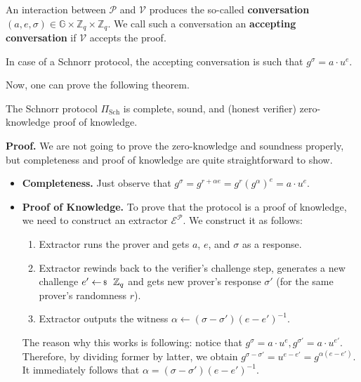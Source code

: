 \documentclass[../lecture-notes-148x210.tex]{subfiles}
\begin{document}
\begin{definition}
    An interaction between $\mathcal{P}$ and $\mathcal{V}$ produces the so-called \textbf{conversation} $(a,e,\sigma) \in \mathbb{G} \times \mathbb{Z}_q \times \mathbb{Z}_q$. We call such a conversation an \textbf{accepting conversation} if $\mathcal{V}$ accepts the proof.
\end{definition}

\begin{example}
    In case of a Schnorr protocol, the accepting conversation is such that $g^{\sigma} = a \cdot u^e$.
\end{example}

Now, one can prove the following theorem.
\begin{theorem}
    The Schnorr protocol $\Pi_{\text{Sch}}$ is complete, sound, and (honest verifier) zero-knowledge proof of knowledge.
\end{theorem}

\textbf{Proof.} We are not going to prove the zero-knowledge and soundness properly, but completeness and proof of knowledge are quite straightforward to show.

\begin{itemize}
    \item \textbf{Completeness.} Just observe that $g^{\sigma} = g^{r+\alpha e} = g^r(g^{\alpha})^e = a \cdot u^e$.
    \item \textbf{Proof of Knowledge.} To prove that the protocol is a proof of knowledge, we need to construct an extractor $\mathcal{E}^{\mathcal{P}}$. We construct it as follows:
    \begin{enumerate}
        \item Extractor runs the prover and gets $a$, $e$, and $\sigma$ as a response.
        \item Extractor rewinds back to the verifier's challenge step, generates a new challenge $e' \leftarrowS \mathbb{Z}_q$ and gets new prover's response $\sigma'$ (for the same prover's randomness $r$).
        \item Extractor outputs the witness $\alpha \gets (\sigma - \sigma')(e - e')^{-1}$.
    \end{enumerate}
    The reason why this works is following: notice that $g^{\sigma} = a \cdot u^{e}, g^{\sigma'} = a \cdot u^{e'}$. Therefore, by dividing former by latter, we obtain $g^{\sigma - \sigma'} = u^{e - e'} = g^{\alpha(e-e')}$. It immediately follows that $\alpha = (\sigma - \sigma')(e - e')^{-1}$.
\end{itemize}
\end{document}
